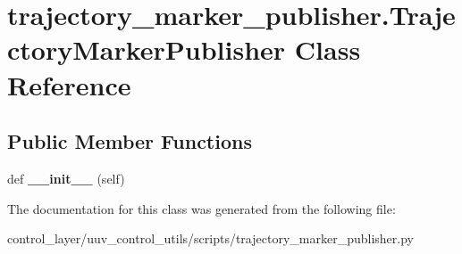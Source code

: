 \hypertarget{classtrajectory__marker__publisher_1_1TrajectoryMarkerPublisher}{}\section{trajectory\+\_\+marker\+\_\+publisher.\+Trajectory\+Marker\+Publisher Class Reference}
\label{classtrajectory__marker__publisher_1_1TrajectoryMarkerPublisher}
\subsection*{Public Member Functions}
\begin{DoxyCompactItemize}
\item 
\mbox{\label{classtrajectory__marker__publisher_1_1TrajectoryMarkerPublisher_a314f5c5dbd49ee046b5112cf82c7e420}} 
def {\bfseries \+\_\+\+\_\+init\+\_\+\+\_\+} (self)
\end{DoxyCompactItemize}


The documentation for this class was generated from the following file\+:\begin{DoxyCompactItemize}
\item 
control\+\_\+layer/uuv\+\_\+control\+\_\+utils/scripts/trajectory\+\_\+marker\+\_\+publisher.\+py\end{DoxyCompactItemize}
